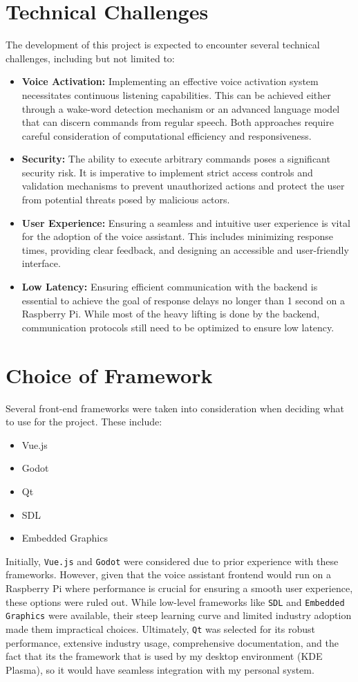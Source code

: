 \section{Technical Challenges}
The development of this project is expected to encounter several technical challenges, including but not limited to:
\begin{itemize}
    \item \textbf{Voice Activation:} Implementing an effective voice activation system necessitates continuous listening capabilities. This can be achieved either through a wake-word detection mechanism or an advanced language model that can discern commands from regular speech. Both approaches require careful consideration of computational efficiency and responsiveness.
    \item \textbf{Security:} The ability to execute arbitrary commands poses a significant security risk. It is imperative to implement strict access controls and validation mechanisms to prevent unauthorized actions and protect the user from potential threats posed by malicious actors.
    \item \textbf{User Experience:} Ensuring a seamless and intuitive user experience is vital for the adoption of the voice assistant. This includes minimizing response times, providing clear feedback, and designing an accessible and user-friendly interface.
    \item \textbf{Low Latency:} Ensuring efficient communication with the backend is essential to achieve the goal of response delays no longer than 1 second on a Raspberry Pi. While most of the heavy lifting is done by the backend, communication protocols still need to be optimized to ensure low latency.
\end{itemize}

\section{Choice of Framework}
Several front-end frameworks were taken into consideration when deciding what to use for the project. These include:
\begin{itemize}
    \item Vue.js
    \item Godot
    \item Qt
    \item SDL
    \item Embedded Graphics
\end{itemize}

Initially, \texttt{Vue.js} and \texttt{Godot} were considered due to prior experience with these frameworks. However, given that the voice assistant frontend would run on a Raspberry Pi where performance is crucial for ensuring a smooth user experience, these options were ruled out. While low-level frameworks like \texttt{SDL} and \texttt{Embedded Graphics} were available, their steep learning curve and limited industry adoption made them impractical choices. Ultimately, \texttt{Qt} was selected for its robust performance, extensive industry usage, comprehensive documentation, and the fact that its the framework that is used by my desktop environment (KDE Plasma), so it would have seamless integration with my personal system.

